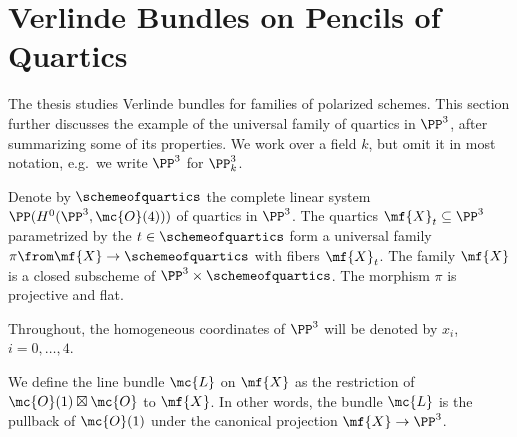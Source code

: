 \section{Verlinde Bundles on Pencils of Quartics}


The thesis \cite{hemminghaus-verlinde-bundles} studies Verlinde bundles for
families of polarized schemes. This section further discusses the example of
the universal family of quartics in $\PP^3$, after summarizing some of its
properties. We work over a field $k$, but omit it in most notation\footnotemark{}, e.g.\ we write $\PP^3$ for $\PP^3_k$.


Denote by $\schemeofquartics$ the complete linear system
$\PP(H^0(\PP^3, \mc{O}(4)))$
of quartics in $\PP^3$. The quartics $\mf{X}_t \subseteq \PP^3$ parametrized by the $t\in\schemeofquartics$ form a universal family
$\pi \from \mf{X} \to \schemeofquartics$ with fibers $\mf{X}_t$.
The family $\mf{X}$ is a closed subscheme of
$\PP^3 \times \schemeofquartics$. The morphism $\pi$ is projective and flat. 


Throughout, the homogeneous coordinates of $\PP^3$ will be denoted by
$x_i$, $i=0,\dotsc,4$.

We define the line bundle $\mc{L}$ on $\mf{X}$ as the restriction of
$\mc{O}(1)\boxtimes\mc{O}$ to $\mf{X}$. In other words\footnotemark{}, the bundle $\mc{L}$ is the pullback of
$\mc{O}(1)$ under the canonical projection $\mf{X} \to \PP^3$.


